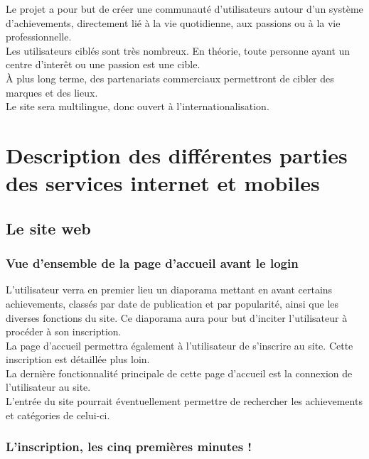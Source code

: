\documentclass{life-fr}
\begin{document}
Le projet a pour but de créer une communauté d'utilisateurs autour d'un système d'achievements, directement lié à la vie quotidienne, aux passions ou à la vie professionnelle.\\

Les utilisateurs ciblés sont très nombreux. En théorie, toute personne ayant un centre d'interêt ou une passion est une cible.\\

À plus long terme, des partenariats commerciaux permettront de cibler des marques et des lieux.\\

Le site sera multilingue, donc ouvert à l'internationalisation.


\chapter{Description des différentes parties des services internet et mobiles}

\section{Le site web}

\subsection{Vue d'ensemble de la page d'accueil avant le login}

L'utilisateur verra en premier lieu un diaporama mettant en avant certains achievements, classés par date de publication et par popularité, ainsi que les diverses fonctions du site. Ce diaporama aura pour but d'inciter l'utilisateur à procéder à son inscription.\\

La page d'accueil permettra également à l'utilisateur de s'inscrire au site. Cette inscription est détaillée plus loin.\\

La dernière fonctionnalité principale de cette page d'accueil est la connexion de l'utilisateur au site.\\

L'entrée du site pourrait éventuellement permettre de rechercher les achievements et catégories de celui-ci.

\newpage

\subsection{L'inscription, les cinq premières minutes !}
\end{document}
